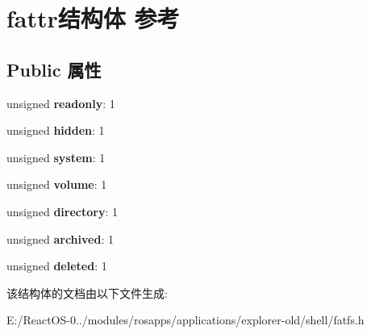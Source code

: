 \hypertarget{structfattr}{}\section{fattr结构体 参考}
\label{structfattr}
\subsection*{Public 属性}
\begin{DoxyCompactItemize}
\item 
\mbox{\label{structfattr_a97ed42c2a7f3f4e637a00b5f8f989346}} 
unsigned {\bfseries readonly}\+: 1
\item 
\mbox{\label{structfattr_aba3fb74a488bbfaf3222e5d6574618b8}} 
unsigned {\bfseries hidden}\+: 1
\item 
\mbox{\label{structfattr_af0d76d15aebd381ecadd3be76cfb95a4}} 
unsigned {\bfseries system}\+: 1
\item 
\mbox{\label{structfattr_afcd87c4446edc319282be8b88e7fddbe}} 
unsigned {\bfseries volume}\+: 1
\item 
\mbox{\label{structfattr_a4dd7aa8ec1e0917435377984034f96bc}} 
unsigned {\bfseries directory}\+: 1
\item 
\mbox{\label{structfattr_af5dec669d65a9536336c1b306a7d4979}} 
unsigned {\bfseries archived}\+: 1
\item 
\mbox{\label{structfattr_a2ab28420bc33990255833a6c479163f3}} 
unsigned {\bfseries deleted}\+: 1
\end{DoxyCompactItemize}


该结构体的文档由以下文件生成\+:\begin{DoxyCompactItemize}
\item 
E\+:/\+React\+O\+S-\/0../modules/rosapps/applications/explorer-\/old/shell/fatfs.\+h\end{DoxyCompactItemize}
